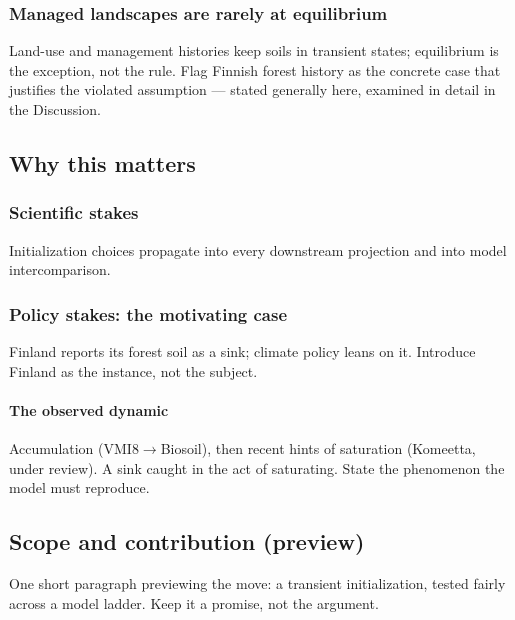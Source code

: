 \documentclass[11pt]{article}
\begin{document}
\subsubsection{Managed landscapes are rarely at equilibrium}
Land-use and management histories keep soils in transient states; equilibrium
is the exception, not the rule. Flag Finnish forest history as the concrete
case that justifies the violated assumption --- stated generally here, examined
in detail in the Discussion.

\subsection{Why this matters}

\subsubsection{Scientific stakes}
Initialization choices propagate into every downstream projection and into
model intercomparison.

\subsubsection{Policy stakes: the motivating case}
Finland reports its forest soil as a sink; climate policy leans on it.
Introduce Finland as the instance, not the subject.

\paragraph{The observed dynamic}
Accumulation (VMI8$\to$Biosoil), then recent hints of saturation (Komeetta,
under review). A sink caught in the act of saturating. State the phenomenon
the model must reproduce.

\subsection{Scope and contribution (preview)}
One short paragraph previewing the move: a transient initialization, tested
fairly across a model ladder. Keep it a promise, not the argument.
\end{document}
